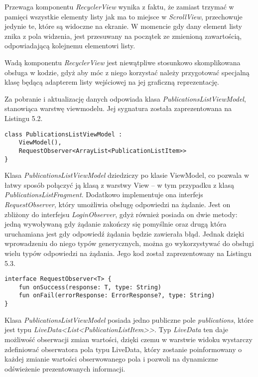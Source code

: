\documentclass[a4paper,12pt,twoside,openany]{report}
\begin{document}
Przewaga komponentu \textit{RecyclerView} wynika z faktu, że zamiast trzymać w pamięci wszystkie elementy listy jak ma to miejsce w \textit{ScrollView}, przechowuje jedynie te, które są widoczne na ekranie. W momencie gdy dany element listy znika z pola widzenia, jest przesuwany na początek ze zmienioną zawartością, odpowiadającą kolejnemu elementowi listy. 

Wadą komponentu \textit{RecyclerView} jest niewątpliwe stosunkowo skomplikowana obsługa w kodzie, gdyż aby móc z niego korzystać należy przygotować specjalną klasę będącą adapterem listy wejściowej na jej graficzną reprezentację.

Za pobranie i aktualizację danych odpowiada klasa  \textit{PublicationsListViewModel}, stanowiąca warstwę viewmodelu.
Jej sygnatura została zaprezentowana na Listingu 5.2.

 \begin{lstlisting}[caption=Sygnatura klasy PublicationsListViewModel,label=code1,captionpos=b]
class PublicationsListViewModel : 
	ViewModel(),
	RequestObserver<ArrayList<PublicationListItem>>   
}
\end{lstlisting} 
Klasa \textit{PublicationsListViewModel} dziedziczy po klasie ViewModel, co pozwala w łatwy sposób połączyć ją klasą z warstwy View -- w tym przypadku z klasą \textit{PublicationsListFragment}. Dodatkowo implementuje ona interfejs \textit{RequestObserver}, który umożliwia obsługę odpowiedzi na żądanie. Jest on zbliżony do interfejsu \textit{LoginObserver}, gdyż również posiada on dwie metody: jedną wywoływaną gdy żądanie zakończy się pomyślnie oraz drugą która uruchamiana jest gdy odpowiedź żądania będzie zawierała błąd. Jednak dzięki wprowadzeniu do niego typów generycznych, można go wykorzystywać do obsługi wielu typów odpowiedzi na żądania. Jego kod został zaprezentowany na Listingu 5.3.

 \begin{lstlisting}[caption=Interfejs RequestObserver,label=code1,captionpos=b]
interface RequestObserver<T> {
	fun onSuccess(response: T, type: String)
	fun onFail(errorResponse: ErrorResponse?, type: String)
}
\end{lstlisting} 
 Klasa \textit{PublicationsListViewModel} posiada jedno publiczne pole \textit{publications}, które jest typu \textit{LiveData<List<PublicationListItem>>}. Typ \textit{LiveData} ten daje możliwość obserwacji zmian wartości, dzięki czemu w warstwie widoku wystarczy zdefiniować obserwatora pola typu LiveData, który zostanie poinformowany o każdej zmianie wartości obserwowanego pola i pozwoli na dynamiczne odświeżenie prezentowanych informacji. 
 
\end{document}
